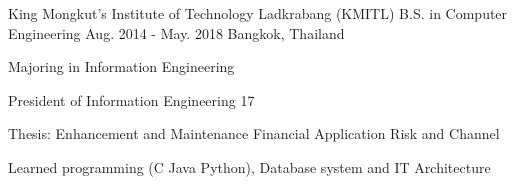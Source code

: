 

\begin{cventries}

    \cventry
    {King Mongkut's Institute of Technology Ladkrabang (KMITL)} %
    {B.S. in Computer Engineering} %
    {Aug. 2014 - May. 2018} %
    {Bangkok, Thailand} %
    {
    \begin{cvitems} %
        \item {Majoring in Information Engineering}
        \item {President of Information Engineering 17}
        \item {Thesis: Enhancement and Maintenance Financial Application Risk and Channel}
        \item {Learned programming (C Java Python), Database system and IT Architecture}
    \end{cvitems}
    }

\end{cventries}
